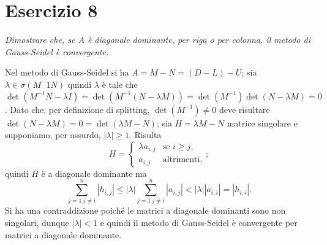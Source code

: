 
\section{Esercizio 8}
\label{sub:es8}
\emph{Dimostrare che, se $A$ è diagonale dominante, per riga o per colonna, il metodo di Gauss-Seidel è convergente.}
\begin{sol}
  Nel metodo di Gauss-Seidel si ha $A=M-N=(D-L)-U$;
   sia $\lambda\in\sigma(M^-1N)$ quindi $\lambda$ è tale che
   $\det{(M^{-1}N-\lambda I)}=\det{(M^{-1}(N-\lambda M))}=\det{(M^{-1})}\det{(N-\lambda M)}=0$.
   Dato che, per definizione di splitting, $\det{(M^{-1})}\neq 0$ deve risultare
   $\det{(N-\lambda M)}=0=\det{(\lambda M-N)}$; sia $H=\lambda M-N$ matrice singolare e supponiamo, per assurdo,
   $|\lambda|\geq 1$. Risulta $$H=\begin{cases}\lambda a_{i,j}&\mbox{se }i\geq j,\\a_{i,j}&\mbox{altrimenti},\end{cases};$$
   quindi $H$ è a diagonale dominante ma $$\sum_{j=1\: j\neq i}^n{|h_{i,j}|}\leq |\lambda|\sum_{j=1\: j\neq i}^n{|a_{i,j}|}<|\lambda||a_{i,i}|=|h_{i,i}|.$$
   Si ha una contraddizione poiché le matrici a diagonale dominanti sono non singolari,
   dunque $|\lambda|<1$ e quindi il metodo di Gauss-Seidel è convergente per matrici a diagonale dominante.
\end{sol}


